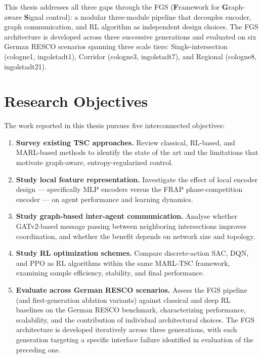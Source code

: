 This thesis addresses all three gaps through the FGS (\textbf{F}ramework for \textbf{G}raph-aware \textbf{S}ignal control): a modular three-module pipeline that decouples encoder, graph communication, and RL algorithm as independent design choices. The FGS architecture is developed across three successive generations and evaluated on six German RESCO scenarios spanning three scale tiers: Single-intersection (cologne1, ingolstadt1), Corridor (cologne3, ingolstadt7), and Regional (cologne8, ingolstadt21).

\section{Research Objectives}
\label{sec:Introduction_ResearchObjectives}

The work reported in this thesis pursues five interconnected objectives:

\begin{enumerate}
  \item \textbf{Survey existing TSC approaches.} Review classical, RL-based, and MARL-based methods to identify the state of the art and the limitations that motivate graph-aware, entropy-regularized control.

  \item \textbf{Study local feature representation.} Investigate the effect of local encoder design — specifically MLP encoders versus the FRAP phase-competition encoder — on agent performance and learning dynamics.

  \item \textbf{Study graph-based inter-agent communication.} Analyse whether GATv2-based message passing between neighboring intersections improves coordination, and whether the benefit depends on network size and topology.

  \item \textbf{Study RL optimization schemes.} Compare discrete-action SAC, DQN, and PPO as RL algorithms within the same MARL-TSC framework, examining sample efficiency, stability, and final performance.

  \item \textbf{Evaluate across German RESCO scenarios.} Assess the FGS pipeline (and first-generation ablation variants) against classical and deep RL baselines on the German RESCO benchmark, characterizing performance, scalability, and the contribution of individual architectural choices. The FGS architecture is developed iteratively across three generations, with each generation targeting a specific interface failure identified in evaluation of the preceding one.
\end{enumerate}

